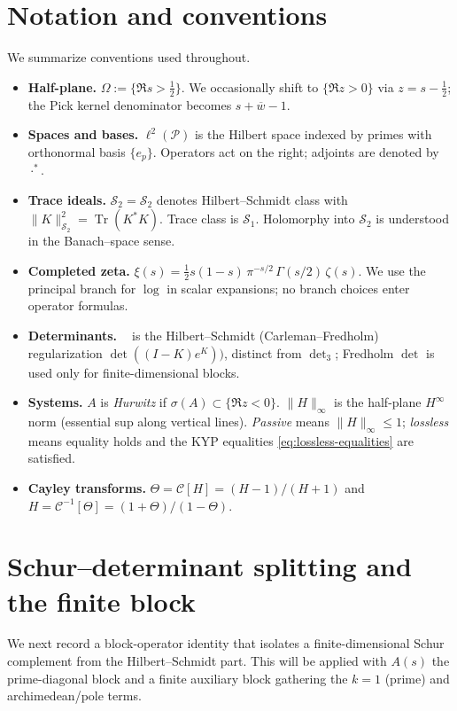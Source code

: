 \documentclass[11pt]{article}
\theoremstyle{definition}
\theoremstyle{remark}
\newcommand{\PP}{\mathcal{P}}
\newcommand{\HS}{\mathcal{S}_2}
\DeclareMathOperator{\Tr}{Tr}
\DeclareMathOperator{\dettwo}{det_2}
\begin{document}
\section{Notation and conventions}\label{sec:notation}
We summarize conventions used throughout.
\begin{itemize}
 \item \textbf{Half-plane.} \(\Omega:=\{\Re s>\tfrac12\}\). We occasionally shift to \(\{\Re z>0\}\) via \(z=s-\tfrac12\); the Pick kernel denominator becomes \(s+\overline{w}-1\).
 \item \textbf{Spaces and bases.} \(\ell^2(\PP)\) is the Hilbert space indexed by primes with orthonormal basis \(\{e_p\}\). Operators act on the right; adjoints are denoted by \(\cdot^*\).
 \item \textbf{Trace ideals.} \(\HS=\mathcal S_2\) denotes Hilbert--Schmidt class with \(\|K\|_{\HS}^2=\Tr(K^*K)\). Trace class is \(\mathcal S_1\). Holomorphy into \(\HS\) is understood in the Banach--space sense.
 \item \textbf{Completed zeta.} \(\xi(s)=\tfrac12 s(1-s)\,\pi^{-s/2}\,\Gamma(s/2)\,\zeta(s)\). We use the principal branch for \(\log\) in scalar expansions; no branch choices enter operator formulas.
\item \textbf{Determinants.} \(\dettwo\) is the Hilbert--Schmidt (Carleman--Fredholm) regularization \(\det((I-K)e^{K}))\), distinct from \(\det_3\); Fredholm \(\det\) is used only for finite-dimensional blocks.
 \item \textbf{Systems.} \(A\) is \emph{Hurwitz} if \(\sigma(A)\subset\{\Re z<0\}\). \(\|H\|_\infty\) is the half-plane \(H^\infty\) norm (essential sup along vertical lines). \emph{Passive} means \(\|H\|_\infty\le 1\); \emph{lossless} means equality holds and the KYP equalities \eqref{eq:lossless-equalities} are satisfied.
 \item \textbf{Cayley transforms.} \(\Theta=\mathcal C[H]=(H-1)/(H+1)\) and \(H=\mathcal C^{-1}[\Theta]=(1+\Theta)/(1-\Theta)\).
\end{itemize}

\section{Schur--determinant splitting and the finite block}\label{sec:schur-split}
We next record a block-operator identity that isolates a finite-dimensional Schur complement from the Hilbert--Schmidt part. This will be applied with \(A(s)\) the prime-diagonal block and a finite auxiliary block gathering the \(k=1\) (prime) and archimedean/pole terms.
\end{document}
